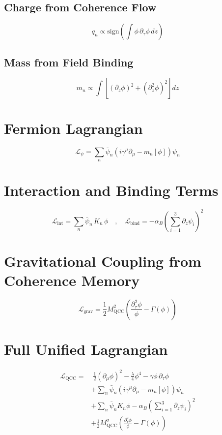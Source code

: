 \documentclass[12pt]{article}
\begin{document}
\subsection*{Charge from Coherence Flow}
\begin{equation}
q_n \propto \text{sign}\left(\int \phi \, \partial_\tau \phi \, dz\right)
\end{equation}

\subsection*{Mass from Field Binding}
\begin{equation}
m_n \propto \int \left[(\partial_z \phi)^2 + (\partial_z^2 \phi)^2 \right] dz
\end{equation}

\section{Fermion Lagrangian}
\begin{equation}
\mathcal{L}_\psi = \sum_n \bar{\psi}_n (i \gamma^\mu \partial_\mu - m_n[\phi]) \psi_n
\end{equation}

\section{Interaction and Binding Terms}
\begin{equation}
\mathcal{L}_{\text{int}} = \sum_n \bar{\psi}_n \, K_n \, \phi \quad , \quad \mathcal{L}_{\text{bind}} = -\alpha_B \left( \sum_{i=1}^3 \partial_z \psi_i \right)^2
\end{equation}

\section{Gravitational Coupling from Coherence Memory}
\begin{equation}
\mathcal{L}_{\text{grav}} = \frac{1}{2} M_{\text{QCC}}^2 \left( \frac{\partial^2_\tau \phi}{\phi} - \Gamma(\phi) \right)
\end{equation}

\section{Full Unified Lagrangian}
\begin{align}
\mathcal{L}_{\text{QCC}} = & \; \frac{1}{2}(\partial_\mu \phi)^2 - \frac{\lambda}{4} \phi^4 - \gamma \phi \, \partial_\tau \phi \\
& + \sum_n \bar{\psi}_n(i\gamma^\mu \partial_\mu - m_n[\phi])\psi_n \\
& + \sum_n \bar{\psi}_n K_n \phi - \alpha_B \left( \sum_{i=1}^3 \partial_z \psi_i \right)^2 \\
& + \frac{1}{2} M_{\text{QCC}}^2 \left( \frac{\partial^2_\tau \phi}{\phi} - \Gamma(\phi) \right)
\end{align}
\end{document}

